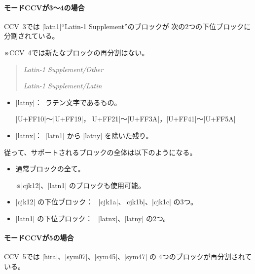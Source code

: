 \documentclass[uplatex,dvipdfmx,a4paper]{jsarticle}
\newcommand{\Note}{\par\noindent ※}
\newcommand{\Means}{：~}
\begin{document}
\paragraph{モードCCVが3～4の場合}

CCV~3では |latn1|“Latin-1 Supplement”のブロックが
次の2つの下位ブロックに分割されている。
\Note CCV~4では新たなブロックの再分割はない。

\begin{quotation}
  \newcommand\xE[2]{\noindent
    \makebox[4em][l]{\texttt{#1}}\textsl{#2}\par}
  \xE{latnx}{Latin-1 Supplement/Other}
  \xE{latny}{Latin-1 Supplement/Latin}
\end{quotation}

\begin{itemize}
\item |latny|\Means ラテン文字であるもの。\par
  |U+FF10|～|U+FF19|，|U+FF21|～|U+FF3A|，|U+FF41|～|U+FF5A|
\item |latnx|\Means |latn1| から |latny| を除いた残り。
\end{itemize}

従って、サポートされるブロックの全体は以下のようになる。

\begin{itemize}
\item 通常ブロックの全て。
  \Note |cjk12|、|latn1| のブロックも使用可能。
\item |cjk12| の下位ブロック\Means
  |cjk1a|、|cjk1b|、|cjk1c| の3つ。
\item |latn1| の下位ブロック\Means
  |latnx|、|latny| の2つ。
\end{itemize}

\paragraph{モードCCVが5の場合}

CCV~5では |hira|、|sym07|、|sym45|、|sym47| の
4つのブロックが再分割されている。
\end{document}
